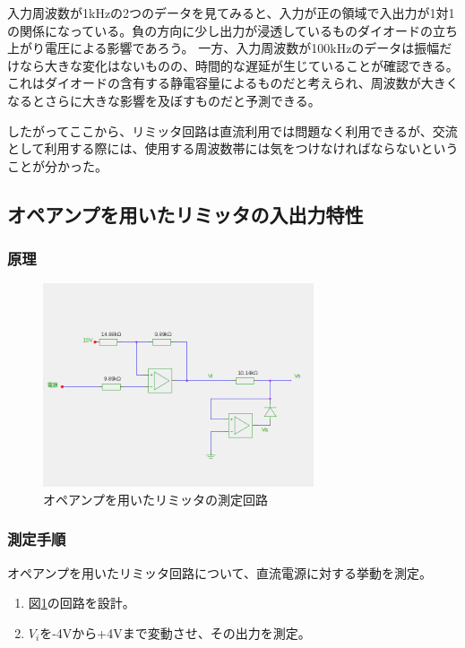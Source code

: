 \documentclass[11pt,a4j]{jsarticle}
\begin{document}
    入力周波数が1kHzの2つのデータを見てみると、入力が正の領域で入出力が1対1の関係になっている。負の方向に少し出力が浸透しているものダイオードの立ち上がり電圧による影響であろう。
    一方、入力周波数が100kHzのデータは振幅だけなら大きな変化はないものの、時間的な遅延が生じていることが確認できる。これはダイオードの含有する静電容量によるものだと考えられ、周波数が大きくなるとさらに大きな影響を及ぼすものだと予測できる。
    
    したがってここから、リミッタ回路は直流利用では問題なく利用できるが、交流として利用する際には、使用する周波数帯には気をつけなければならないということが分かった。
    
    
  \subsection{オペアンプを用いたリミッタの入出力特性}
   \subsubsection{原理}
    
    \begin{figure}[htbp]
  \centering
  \includegraphics[width=8cm,clip]{amp_tokusei.png}
  \caption{オペアンプを用いたリミッタの測定回路}
  \label{fig:amp_tokusei}
 \end{figure}%
    
   \subsubsection{測定手順}
    オペアンプを用いたリミッタ回路について、直流電源に対する挙動を測定。
    \begin{enumerate}
    \item 図\ref{fig:amp_tokusei}の回路を設計。
    \item $V_i$を-4Vから+4Vまで変動させ、その出力を測定。
    \end{enumerate}
    
\end{document}
